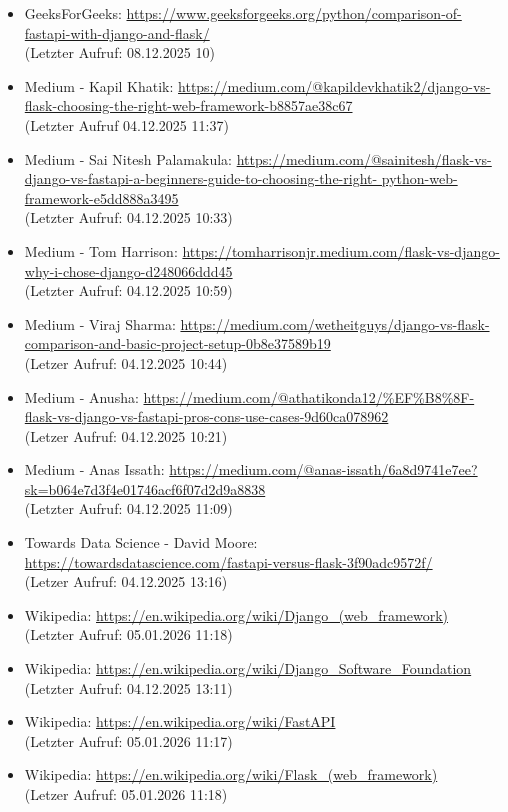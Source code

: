\documentclass[letterpaper,11pt,leqno]{article}
\begin{document}
\begin{itemize}
	\item GeeksForGeeks: \url{https://www.geeksforgeeks.org/python/comparison-of-fastapi-with-django-and-flask/}\\(Letzter Aufruf: 08.12.2025 10)
	\item Medium - Kapil Khatik: \url{https://medium.com/@kapildevkhatik2/django-vs-flask-choosing-the-right-web-framework-b8857ae38c67}\\(Letzter
	Aufruf 04.12.2025 11:37)
	\item Medium - Sai Nitesh Palamakula: \url{https://medium.com/@sainitesh/flask-vs-django-vs-fastapi-a-beginners-guide-to-choosing-the-right-
	python-web-framework-e5dd888a3495}\\(Letzter Aufruf: 04.12.2025 10:33)
	\item Medium - Tom Harrison: \url{https://tomharrisonjr.medium.com/flask-vs-django-why-i-chose-django-d248066ddd45}\\(Letzter Aufruf: 04.12.2025
	10:59)
	\item Medium - Viraj Sharma: \url{https://medium.com/wetheitguys/django-vs-flask-comparison-and-basic-project-setup-0b8e37589b19}\\(Letzer Aufruf:
	04.12.2025 10:44)
	\item Medium - Anusha: \url{https://medium.com/@athatikonda12/%EF%B8%8F-flask-vs-django-vs-fastapi-pros-cons-use-cases-9d60ca078962}\\(Letzer
	Aufruf: 04.12.2025 10:21)
	\item Medium - Anas Issath: \url{https://medium.com/@anas-issath/6a8d9741e7ee?sk=b064e7d3f4e01746acf6f07d2d9a8838}\\(Letzter Aufruf: 04.12.2025
	11:09)
	\item Towards Data Science - David Moore: \url{https://towardsdatascience.com/fastapi-versus-flask-3f90adc9572f/}\\(Letzer Aufruf: 04.12.2025
	13:16)
	\item Wikipedia: \url{https://en.wikipedia.org/wiki/Django_(web_framework)}\\(Letzter Aufruf: 05.01.2026 11:18)
	\item Wikipedia: \url{https://en.wikipedia.org/wiki/Django_Software_Foundation}\\(Letzter Aufruf: 04.12.2025 13:11)
	\item Wikipedia: \url{https://en.wikipedia.org/wiki/FastAPI}\\(Letzter Aufruf: 05.01.2026 11:17)
	\item Wikipedia: \url{https://en.wikipedia.org/wiki/Flask_(web_framework)}\\(Letzer Aufruf: 05.01.2026 11:18)
\end{itemize}
\end{document}

